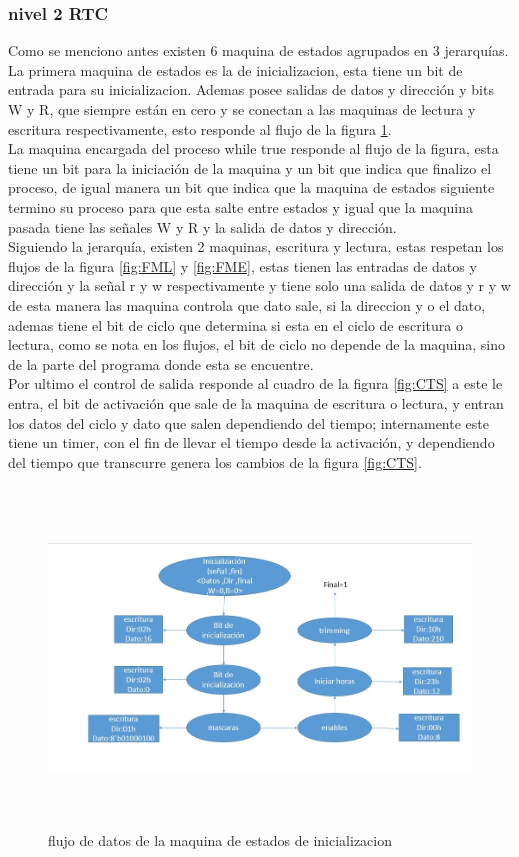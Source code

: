 \documentclass[12pt,a4paper]{article}
\begin{document}
		\subsubsection{nivel 2 RTC}
		Como se menciono antes existen 6 maquina de estados agrupados en 3 jerarquías.\\[2ex]
 		La primera maquina de estados es la de inicializacion, esta tiene un bit de entrada para su inicializacion. Ademas posee salidas de datos y dirección  y bits W y R, que siempre están en cero y se conectan a las maquinas de lectura y escritura respectivamente, esto responde al flujo de la figura \ref{fig:FMEI}.\\[2ex]
		La maquina encargada del proceso while true responde al flujo de la figura, esta tiene un bit para la iniciación de la maquina y un bit que indica que finalizo el proceso, de igual manera un bit que indica que la maquina de estados siguiente termino su proceso para que esta salte entre estados y igual que la maquina pasada tiene las señales W y R y la salida de datos y dirección.\\[2ex]
		Siguiendo la jerarquía, existen 2 maquinas, escritura y lectura, estas respetan los flujos de la figura \ref{fig:FML} y \ref{fig:FME}, estas tienen las entradas de datos y dirección y la señal r y w respectivamente y tiene solo una salida de datos y r y w de esta manera las maquina controla que dato sale, si la direccion y o el dato, ademas tiene el bit de ciclo que determina si esta en el ciclo de escritura o lectura, como se nota en los flujos, el bit de ciclo no depende de la maquina, sino de la parte del programa donde esta se encuentre.\\[2ex]
		Por ultimo el control de salida responde al cuadro de la figura \ref{fig:CTS} a este le entra, el bit de activación que sale de la maquina de escritura o lectura, y entran los datos del ciclo y dato que salen dependiendo del tiempo; internamente este tiene un timer, con el fin de llevar el tiempo desde la activación, y dependiendo del tiempo que transcurre genera los cambios de la figura \ref{fig:CTS}. \\[2ex]
		\begin{figure}[htbp]
			\centering
			\includegraphics[height=9cm, width=16cm]{img/FlujoInit.jpg}
			\caption[3erNivel]{flujo de datos de la maquina de estados de inicializacion}
			\label{fig:FMEI}
		\end{figure}
\end{document}
